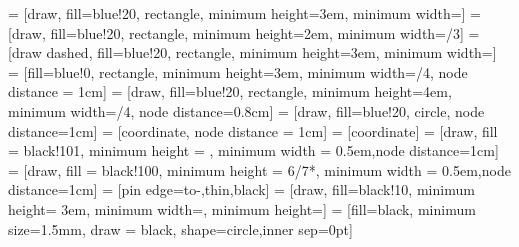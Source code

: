 %




 = [draw, fill=blue!20, rectangle,
minimum height=3em, minimum width=\blockwidth]
 = [draw, fill=blue!20, rectangle,
minimum height=2em, minimum width=\blockwidth/3] %
 = [draw dashed, fill=blue!20, rectangle,
minimum height=3em, minimum width=\blockwidth]
 = [fill=blue!0, rectangle,
minimum height=3em, minimum width=\blockwidth/4, node distance = 1cm]
 = [draw, fill=blue!20, rectangle,
minimum height=4em, minimum width=\blockwidth/4, node distance=0.8cm]
 = [draw, fill=blue!20, circle, node distance=1cm]
 = [coordinate, node distance = 1cm]
 = [coordinate]
 = [draw, fill = black!101, minimum height = \muxheight, minimum width = 0.5em,node distance=1cm]
 = [draw, fill = black!100, minimum height = 6/7*\muxheight, minimum width = 0.5em,node distance=1cm]
 = [pin edge={to-,thin,black}]
 = [draw, fill=black!10, minimum height= 3em, minimum width=\VarSysWidth, minimum height=\VarSysHeight]
 = [fill=black, minimum size=1.5mm, draw = black, shape=circle,inner sep=0pt]






